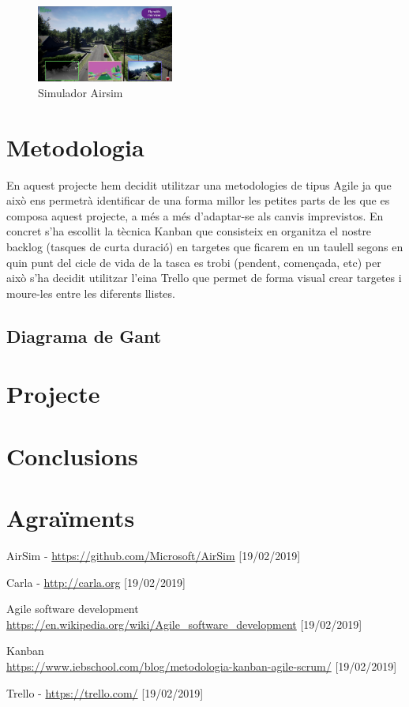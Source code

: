 \documentclass[10pt,a4paper,twocolumn,twoside]{article}
\begin{document}
\begin{figure}[!h]
\centering
  	\includegraphics[width=0.4\textwidth]{airsim}
	\caption{Simulador Airsim}
	\label{fig-airsim}
\end{figure}

\section{Metodologia}

En aquest projecte hem decidit utilitzar una metodologies de tipus Agile \cite{agile} ja que això ens permetrà identificar de una forma millor les petites parts de les que es composa aquest projecte, a més a més d'adaptar-se als canvis imprevistos. En concret s'ha escollit la tècnica Kanban \cite{kanban} que consisteix en organitza el nostre backlog (tasques de curta duració) en 
targetes que ficarem en un taulell segons en quin punt del cicle de vida de la tasca es trobi (pendent, començada, etc) per això s'ha decidit utilitzar l'eina Trello \cite{trello} que permet de forma visual crear targetes i moure-les entre les diferents llistes.

\subsection{Diagrama de Gant}

\section{Projecte}

\section{Conclusions}


\section*{Agraïments}


\begin{thebibliography}{11}
AirSim - \url{https://github.com/Microsoft/AirSim} [19/02/2019]


Carla - \url{http://carla.org} [19/02/2019]

Agile software development
\\ \url{https://en.wikipedia.org/wiki/Agile_software_development}
[19/02/2019]

Kanban
\\ \url{https://www.iebschool.com/blog/metodologia-kanban-agile-scrum/} [19/02/2019]

Trello - \url{https://trello.com/} [19/02/2019]


\end{thebibliography}
\end{document}
